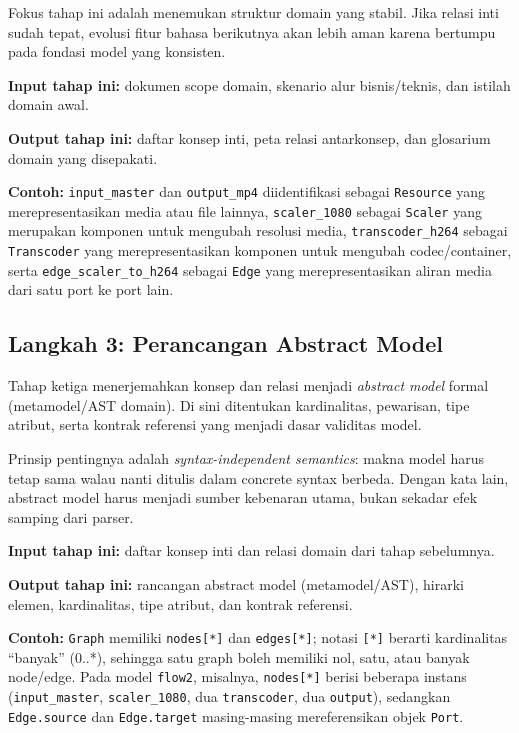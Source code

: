 Fokus tahap ini adalah menemukan struktur domain yang stabil. Jika relasi inti sudah tepat, evolusi fitur bahasa berikutnya akan lebih aman karena bertumpu pada fondasi model yang konsisten.

\textbf{Input tahap ini:} dokumen scope domain, skenario alur bisnis/teknis, dan istilah domain awal.

\textbf{Output tahap ini:} daftar konsep inti, peta relasi antarkonsep, dan glosarium domain yang disepakati.

\textbf{Contoh:} \texttt{input\_master} dan \texttt{output\_mp4} diidentifikasi sebagai \texttt{Resource} yang merepresentasikan media atau file lainnya, \texttt{scaler\_1080} sebagai \texttt{Scaler} yang merupakan komponen untuk mengubah resolusi media, \texttt{transcoder\_h264} sebagai \texttt{Transcoder} yang merepresentasikan komponen untuk mengubah codec/container, serta \texttt{edge\_scaler\_to\_h264} sebagai \texttt{Edge} yang merepresentasikan aliran media dari satu port ke port lain.

\subsection{Langkah 3: Perancangan Abstract Model}

Tahap ketiga menerjemahkan konsep dan relasi menjadi \textit{abstract model} formal (metamodel/AST domain). Di sini ditentukan kardinalitas, pewarisan, tipe atribut, serta kontrak referensi yang menjadi dasar validitas model.

Prinsip pentingnya adalah \textit{syntax-independent semantics}: makna model harus tetap sama walau nanti ditulis dalam concrete syntax berbeda. Dengan kata lain, abstract model harus menjadi sumber kebenaran utama, bukan sekadar efek samping dari parser.

\textbf{Input tahap ini:} daftar konsep inti dan relasi domain dari tahap sebelumnya.

\textbf{Output tahap ini:} rancangan abstract model (metamodel/AST), hirarki elemen, kardinalitas, tipe atribut, dan kontrak referensi.

\textbf{Contoh:} \texttt{Graph} memiliki \texttt{nodes[*]} dan \texttt{edges[*]}; notasi \texttt{[*]} berarti kardinalitas ``banyak'' (0..*), sehingga satu graph boleh memiliki nol, satu, atau banyak node/edge. Pada model \texttt{flow2}, misalnya, \texttt{nodes[*]} berisi beberapa instans (\texttt{input\_master}, \texttt{scaler\_1080}, dua \texttt{transcoder}, dua \texttt{output}), sedangkan \texttt{Edge.source} dan \texttt{Edge.target} masing-masing mereferensikan objek \texttt{Port}.

